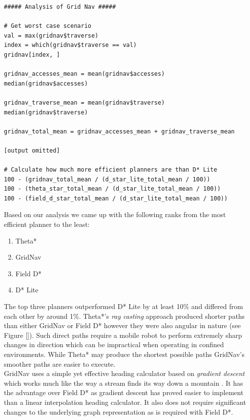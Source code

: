 \begin{lstlisting}
##### Analysis of Grid Nav #####

# Get worst case scenario
val = max(gridnav$traverse)
index = which(gridnav$traverse == val)
gridnav[index, ]

gridnav_accesses_mean = mean(gridnav$accesses)
median(gridnav$accesses)

gridnav_traverse_mean = mean(gridnav$traverse)
median(gridnav$traverse)

gridnav_total_mean = gridnav_accesses_mean + gridnav_traverse_mean

[output omitted]

# Calculate how much more efficient planners are than D* Lite
100 - (gridnav_total_mean / (d_star_lite_total_mean / 100))
100 - (theta_star_total_mean / (d_star_lite_total_mean / 100))
100 - (field_d_star_total_mean / (d_star_lite_total_mean / 100))
\end{lstlisting}

\noindent
Based on our analysis we came up with the following ranks from the most efficient planner to the least:

\begin{enumerate}
\item Theta*
\item GridNav
\item Field D*
\item D* Lite
\end{enumerate}

\noindent
The top three planners outperformed D* Lite by at least 10\% and differed from each other by around 1\%. Theta*'s \textit{ray casting} approach produced shorter paths than either GridNav or Field D* however they were also angular in nature (see Figure \ref{}). Such direct paths require a mobile robot to perform extremely sharp changes in direction which can be impractical when operating in confined environments. While Theta* may produce the shortest possible paths GridNav's smoother paths are easier to execute. \\ 

\noindent
GridNav uses a simple yet effective heading calculator based on \textit{gradient descent} which works much like the way a stream finds its way down a mountain \cite{GRIDNAV95}. It has the advantage over Field D* as gradient descent has proved easier to implement than a linear interpolation heading calculator. It also does not require significant changes to the underlying graph representation as is required with Field D*.

